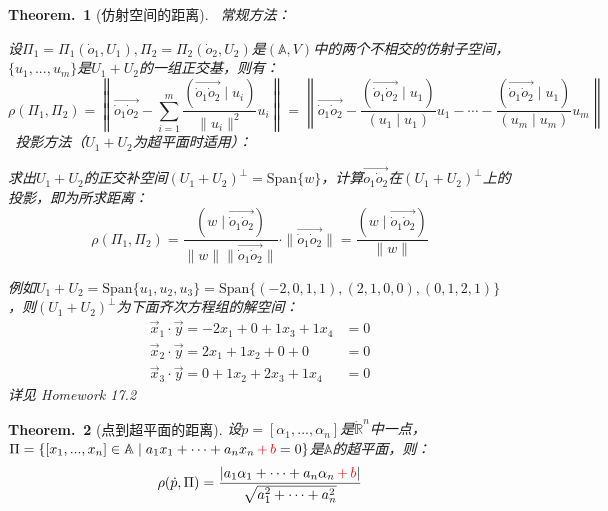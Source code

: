 \documentclass[zihao=5,UTF8]{report}
\def\R{\mathbb{R}}
\def\A{\mathbb{A}}
\theoremstyle{mystyle} %
\newtheorem{theorem}{Theorem.\,}
\begin{document}
\begin{theorem}[仿射空间的距离]\label{仿射空间的距离}
\ 常规方法：\par
设$\Pi_1 = \Pi_1(\dot{o}_1,U_1), \Pi_2 = \Pi_2(\dot{o}_2,U_2)$是$(\A, V)$中的两个不相交的仿射子空间，$\{u_1,...,u_m\}$是$U_1+U_2$的一组{\color{red}正交基}，则有：
\begin{equation*}
    \rho(\Pi_1,\Pi_2)= \left \|  \overrightarrow{\dot{o}_1\dot{o}_2} - \sum_{i=1}^{m}\frac{(\overrightarrow{\dot{o}_1\dot{o}_2}\mid u_i)}{\| u_i \|^2}u_i  \right \|=\left \| \overrightarrow{\dot{o}_1\dot{o}_2} - \frac{(\overrightarrow{\dot{o}_1\dot{o}_2}\mid u_1)}{(u_1\mid u_1)}u_1 - \cdots -   \frac{(\overrightarrow{\dot{o}_1\dot{o}_2}\mid u_1)}{(u_m\mid u_m)}u_m \right \|
\end{equation*}
\ 投影方法（$U_1 + U_2$为超平面时适用）：\par
求出$U_1+U_2$的正交补空间$(U_1+U_2)^{\perp} = \text{Span}\{w\}$，计算$\overrightarrow{\dot{o}_1\dot{o}_2}$在$(U_1+U_2)^{\perp}$上的投影，即为所求距离：
\begin{equation*}
    \rho(\Pi_1,\Pi_2) = \frac{( w \mid \overrightarrow{\dot{o}_1\dot{o}_2} )}{\| w \|\| \overrightarrow{\dot{o}_1\dot{o}_2} \|} \cdot \| \overrightarrow{\dot{o}_1\dot{o}_2} \| = \frac{( w \mid \overrightarrow{\dot{o}_1\dot{o}_2} )}{\| w \|} 
\end{equation*}
{\par\color{gray}\small
例如$U_1+U_2 =\text{Span}\{ u_1, u_2, u_3 \} = \text{Span}\{ (-2,0,1,1), (2,1,0,0), (0,1,2,1) \}$，则$(U_1+U_2)^{\perp}$为下面齐次方程组的解空间：
\begin{align*}
    \vec{x}_1\cdot\vec{y} = -2x_1 + 0 +1x_3 + 1x_4&= 0\\ 
    \vec{x}_2\cdot\vec{y} = 2x_1 + 1x_2 +0 +0 &= 0\\ 
    \vec{x}_3\cdot\vec{y} = 0 + 1x_2 + 2x_3 + 1x_4 &= 0
\end{align*}
详见 Homework 17.2
\par}
\end{theorem}

\begin{theorem}[点到超平面的距离]\label{点到超平面的距离}
设$\dot{p} = [\alpha_1,...,\alpha_n]$是$\dot{\R}^n$中一点，$\Pi = \{[x_1,...,x_n]\in \A \mid a_1x_1 + \cdots + a_nx_n \textcolor{red}{\,+\,b} = 0 \}$是$\A$的超平面，则：
\begin{equation*}
    \rho(\dot{p},\Pi) = \frac{\left| a_1\alpha_1 + \cdots +a_n\alpha_n \textcolor{red}{\,+\,b}\right| }{\sqrt{a_1^2+\cdots+a_n^2}}
\end{equation*}
\end{theorem}
\end{document}
